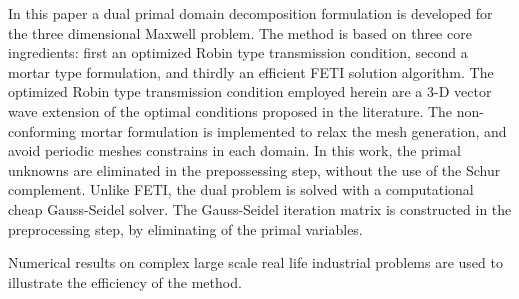 \documentclass{report}
\begin{document}
In this paper a dual primal domain decomposition formulation is
developed for the three dimensional Maxwell problem. The method is
based on three core ingredients: first an optimized Robin type
transmission condition, second a mortar type formulation, and thirdly
an efficient FETI solution algorithm. The optimized Robin type
transmission condition employed herein are a 3-D vector wave extension
of the optimal conditions proposed in the literature. The
non-conforming mortar formulation is implemented to relax the mesh
generation, and avoid periodic meshes constrains in each domain. In this
work, the primal unknowns are eliminated in
the prepossessing step, without the use of the Schur
complement. Unlike FETI, the dual
problem is solved with a computational cheap Gauss-Seidel solver. The
Gauss-Seidel iteration matrix is constructed in the preprocessing
step, by eliminating of the primal variables.

Numerical results on complex large scale real life industrial
problems are used to illustrate the efficiency of the method.
\end{document}
